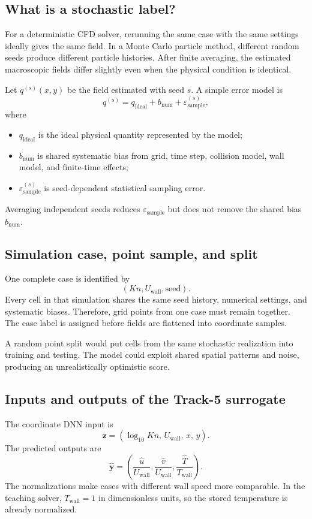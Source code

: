 \documentclass[11pt]{article}
\begin{document}
\subsection{What is a stochastic label?}
For a deterministic CFD solver, rerunning the same case with the same settings ideally gives the same field. In a Monte Carlo particle method, different random seeds produce different particle histories. After finite averaging, the estimated macroscopic fields differ slightly even when the physical condition is identical.

Let $q^{(s)}(x,y)$ be the field estimated with seed $s$. A simple error model is
\[
q^{(s)}=q_{\mathrm{ideal}}+b_{\mathrm{num}}+\varepsilon^{(s)}_{\mathrm{sample}},
\]
where
\begin{itemize}
\item $q_{\mathrm{ideal}}$ is the ideal physical quantity represented by the model;
\item $b_{\mathrm{num}}$ is shared systematic bias from grid, time step, collision model, wall model, and finite-time effects;
\item $\varepsilon^{(s)}_{\mathrm{sample}}$ is seed-dependent statistical sampling error.
\end{itemize}
Averaging independent seeds reduces $\varepsilon_{\mathrm{sample}}$ but does not remove the shared bias $b_{\mathrm{num}}$.

\subsection{Simulation case, point sample, and split}
One complete case is identified by
\[
(Kn,U_{\mathrm{wall}},\mathrm{seed}).
\]
Every cell in that simulation shares the same seed history, numerical settings, and systematic biases. Therefore, grid points from one case must remain together. The case label is assigned before fields are flattened into coordinate samples.

\begin{warningbox}
A random point split would put cells from the same stochastic realization into training and testing. The model could exploit shared spatial patterns and noise, producing an unrealistically optimistic score.
\end{warningbox}

\subsection{Inputs and outputs of the Track-5 surrogate}
The coordinate DNN input is
\[
\mathbf z=(\log_{10}Kn,\,U_{\mathrm{wall}},\,x,\,y).
\]
The predicted outputs are
\[
\widehat{\mathbf y}=\left(\frac{\hat u}{U_{\mathrm{wall}}},
\frac{\hat v}{U_{\mathrm{wall}}},
\frac{\hat T}{T_{\mathrm{wall}}}\right).
\]
The normalizations make cases with different wall speed more comparable. In the teaching solver, $T_{\mathrm{wall}}=1$ in dimensionless units, so the stored temperature is already normalized.
\end{document}
